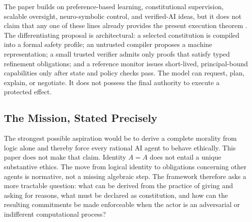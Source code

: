 \documentclass[11pt]{article}
\begin{document}
The paper builds on preference-based learning, constitutional supervision, scalable oversight, neuro-symbolic control, and verified-AI ideas, but it does not claim that any one of these lines already provides the present execution theorem \cite{christiano,bai-constitutional,scalable-oversight,coco,seshia}. The differentiating proposal is architectural: a selected constitution is compiled into a formal safety profile; an untrusted compiler proposes a machine representation; a small trusted verifier admits only proofs that satisfy typed refinement obligations; and a reference monitor issues short-lived, principal-bound capabilities only after state and policy checks pass. The model can request, plan, explain, or negotiate. It does not possess the final authority to execute a protected effect.

\subsection{The Mission, Stated Precisely}
The strongest possible aspiration would be to derive a complete morality from logic alone and thereby force every rational AI agent to behave ethically. This paper does not make that claim. Identity \(A=A\) does not entail a unique substantive ethics. The move from logical identity to obligations concerning other agents is normative, not a missing algebraic step. The framework therefore asks a more tractable question: what can be derived from the practice of giving and asking for reasons, what must be declared as constitution, and how can the resulting commitments be made enforceable when the actor is an adversarial or indifferent computational process?
\end{document}
